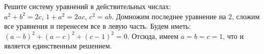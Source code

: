 \problem{}
Решите систему уравнений в действительных числах:\\
$a^2 + b^2 = 2 c$,\quad
$1 + a^2 = 2 a c$,\quad
$c^2 = a b$.
\solution
Домножим последнее уравнение на 2, сложим все уравнения и перенесем все в левую
часть.
Будем иметь: $(a - b)^2 + (a - c)^2 + (c - 1)^2 = 0$.
Отсюда, имеем $a = b = c = 1$, что и является единственным решением.
\endproblem
